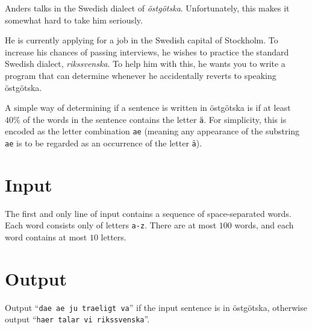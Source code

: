 Anders talks in the Swedish dialect of \emph{östgötska}.
Unfortunately, this makes it somewhat hard to take him seriously.

He is currently applying for a job in the Swedish capital of Stockholm.
To increase his chances of passing interviews, he wishes to practice the standard Swedish dialect,
\emph{rikssvenska}.
To help him with this, he wants you to write a program that can determine whenever he accidentally reverts to speaking östgötska.

A simple way of determining if a sentence is written in östgötska is if at least $40\%$ of the words in the sentence contains the letter \texttt{ä}.
For simplicity, this is encoded as the letter combination \texttt{ae} (meaning any appearance of the substring \texttt{ae} is to be regarded as an occurrence of the letter \texttt{ä}).

\section*{Input}
The first and only line of input contains a sequence of space-separated words.
Each word consists only of letters \texttt{a-z}.
There are at most $100$ words, and each word contains at most $10$ letters.

\section*{Output}
Output ``\texttt{dae ae ju traeligt va}'' if the input sentence is in östgötska, otherwise output ``\texttt{haer talar vi rikssvenska}''.
